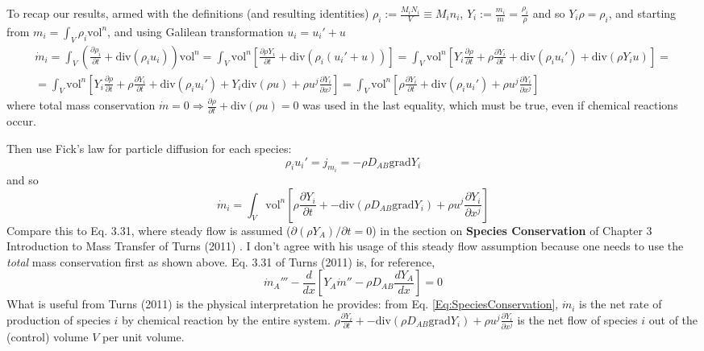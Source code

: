 \documentclass[10pt]{amsart}
\begin{document}
\begin{multicols*}{2}
To recap our results, armed with the definitions (and resulting identities) $\rho_i := \frac{M_iN_i}{V} \equiv M_i n_i$, $Y_i:= \frac{m_i}{m} = \frac{\rho_i}{\rho}$ and so $Y_i\rho = \rho_i$, and starting from $m_i = \int_V \rho_i \text{vol}^n$, and using Galilean transformation $u_i = u_i' +u$
\[
\begin{gathered}
  \dot{m}_i = \int_V \left( \frac{ \partial \rho_i }{ \partial t} + \text{div}(\rho_i u_i ) \right) \text{vol}^n = \int_V \text{vol}^n \left[ \frac{ \partial \rho Y_i}{ \partial t} + \text{div}(\rho_i(u_i' +u)) \right] =  \int_V \text{vol}^n \left[ Y_i \frac{ \partial \rho }{ \partial t} + \rho \frac{ \partial Y_i}{ \partial t} + \text{div}(\rho_i u_i') + \text{div}(\rho Y_i u) \right] = \\
  =  \int_V \text{vol}^n \left[ Y_i \frac{ \partial \rho }{ \partial t} + \rho \frac{ \partial Y_i}{ \partial t} + \text{div}(\rho_i u_i') + Y_i \text{div}(\rho u) + \rho u^j \frac{ \partial Y_i}{ \partial x^j} \right] = \int_V \text{vol}^n \left[ \rho \frac{ \partial Y_i}{ \partial t} + \text{div}(\rho_i u_i') + \rho u^j \frac{ \partial Y_i}{ \partial x^j} \right]
\end{gathered}
\]
where total mass conservation $\dot{m} =0 \Longrightarrow \frac{ \partial \rho}{ \partial t} + \text{div}(\rho u)=0$ was used in the last equality, which must be true, even if chemical reactions occur.  

Then use Fick's law for particle diffusion for each species:
\[
\rho_i u_i' = j_{m_i} = -\rho D_{AB} \text{grad}Y_i
\]
and so
\begin{equation}\label{Eq:SpeciesConservation}
  \boxed{ \dot{m}_i = \int_V \text{vol}^n \left[ \rho \frac{ \partial Y_i}{ \partial t} + - \text{div}(\rho D_{AB} \text{grad}Y_i ) + \rho u^j \frac{ \partial Y_i}{ \partial x^j} \right] }
\end{equation}
Compare this to Eq. 3.31, where steady flow is assumed ($\partial (\rho Y_A)/\partial t =0$) in the section on \textbf{Species Conservation} of Chapter 3 Introduction to Mass Transfer of Turns (2011) \cite{STurns2011}.  I don't agree with his usage of this steady flow assumption because one needs to use the \emph{total} mass conservation first as shown above.  Eq. 3.31 of Turns (2011) \cite{STurns2011} is, for reference,
\[
\dot{m}_A''' - \frac{d}{dx} \left[ Y_A \dot{m}'' - \rho D_{AB} \frac{dY_A}{dx} \right] = 0 
\] 
What is useful from Turns (2011) \cite{STurns2011} is the physical interpretation he provides: from Eq. \ref{Eq:SpeciesConservation}, $\dot{m}_i$ is the net rate of production of species $i$ by chemical reaction by the entire system.  $\rho \frac{ \partial Y_i}{ \partial t} + -\text{div}(\rho D_{AB} \text{grad}Y_i ) + \rho u^j \frac{ \partial Y_i}{ \partial x^j}$ is the net flow of species $i$ out of the (control) volume $V$ per unit volume.  


\end{multicols*}
\end{document}
